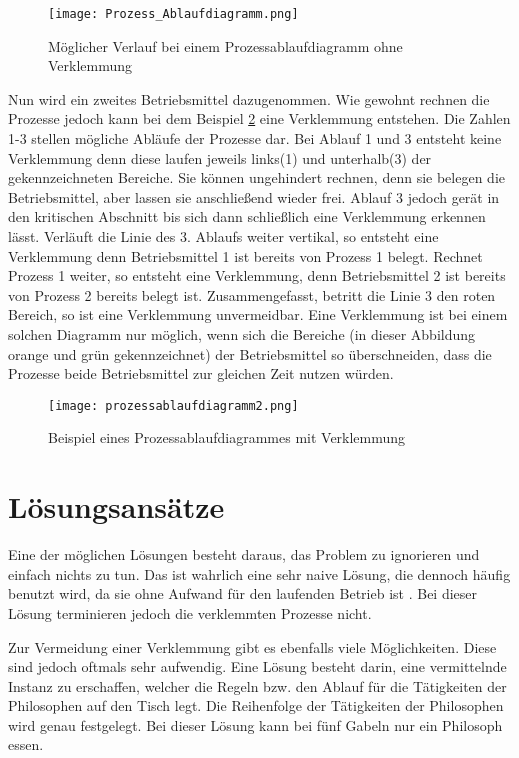 \begin{figure}[H]
\caption{Möglicher Verlauf bei einem Prozessablaufdiagramm ohne Verklemmung}
\label{fig:normales_Ablaufdiagramm}
\centering
\texttt{[image: Prozess\_Ablaufdiagramm.png]}
\end{figure}

Nun wird ein zweites Betriebsmittel dazugenommen. Wie gewohnt rechnen die Prozesse jedoch kann bei dem Beispiel \ref{fig:verklemmtes_ablaufdiagramm} eine Verklemmung entstehen. Die Zahlen 1-3 stellen mögliche Abläufe der Prozesse dar. Bei Ablauf 1 und 3 entsteht keine Verklemmung denn diese laufen jeweils links(1) und unterhalb(3) der gekennzeichneten Bereiche. Sie können ungehindert rechnen, denn sie belegen die Betriebsmittel, aber lassen sie anschließend wieder frei. Ablauf 3 jedoch gerät in den kritischen Abschnitt bis sich dann schließlich eine Verklemmung erkennen lässt. Verläuft die Linie des 3. Ablaufs weiter vertikal, so entsteht eine Verklemmung denn Betriebsmittel 1 ist bereits von Prozess 1 belegt. Rechnet Prozess 1 weiter, so entsteht eine Verklemmung, denn Betriebsmittel 2 ist bereits von Prozess 2 bereits belegt ist. Zusammengefasst, betritt die Linie 3 den roten Bereich, so ist eine Verklemmung unvermeidbar.
Eine Verklemmung ist bei einem solchen Diagramm nur möglich, wenn sich die Bereiche (in dieser Abbildung orange und grün gekennzeichnet) der Betriebsmittel so überschneiden, dass die Prozesse beide Betriebsmittel zur gleichen Zeit nutzen würden.

\begin{figure}[H]
\caption{Beispiel eines Prozessablaufdiagrammes mit Verklemmung}
\label{fig:verklemmtes_ablaufdiagramm}
\centering
\texttt{[image: prozessablaufdiagramm2.png]}
\end{figure}

\section{Lösungsansätze}
\label{sec:lösung}

Eine der möglichen Lösungen besteht daraus, das Problem zu ignorieren und einfach nichts zu tun. Das ist wahrlich eine sehr naive Lösung, die dennoch häufig benutzt wird, da sie ohne Aufwand für den laufenden Betrieb ist \parencite[vgl. ][S.79]{mandl2020} . Bei dieser Lösung terminieren jedoch die verklemmten Prozesse nicht.
 
Zur Vermeidung einer Verklemmung gibt es ebenfalls viele Möglichkeiten. Diese sind jedoch oftmals sehr  aufwendig. Eine Lösung besteht darin, eine vermittelnde Instanz zu erschaffen, welcher die Regeln bzw. den Ablauf für die Tätigkeiten der Philosophen auf den Tisch legt. Die Reihenfolge der Tätigkeiten der Philosophen wird genau festgelegt. Bei dieser Lösung kann bei fünf Gabeln nur ein Philosoph essen.\parencite[vgl.][S.220]{tanenbaum2016}

